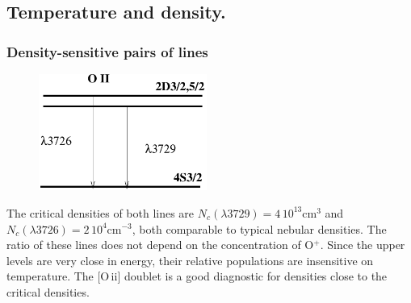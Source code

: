 \subsection{Temperature and density.}
\begin{frame}\frametitle{Density-sensitive pairs of  lines}


\begin{figure}
    \vspace{-0.5cm}
\includegraphics[width=0.49\textwidth,height=!]{./C/oii.pdf}
\end{figure}  \vspace{0.1cm}  The critical densities of both lines are 
 $N_c(\lambda3729) = 4\,10^{13}$cm$^{3}$ and $N_c(\lambda3726) =
2\,10^{4}$cm$^{-3}$, both comparable to typical nebular densities. The
ratio of these lines does not depend on the concentration of
O$^+$. Since the upper levels are very close in energy, their relative
populations are insensitive on temperature. The [O\,{\sc ii}] doublet
is a good diagnostic for densities close to the critical densities.

\end{frame}
